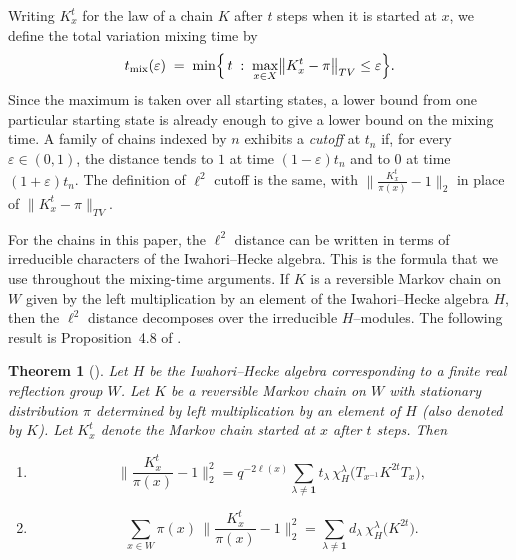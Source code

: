 \documentclass[11pt]{article}
\theoremstyle{plain}  %
\newtheorem{theorem}{Theorem}[section]
\begin{document}
Writing $K^{t}_{x}$ for the law of a chain $K$ after $t$ steps when it is
started at $x$, we define the total variation mixing time by
$$
  t_{\mathrm{mix}}(\varepsilon)
  \;=\; \min\Bigl\{\,t \;:\; \max_{x \in X}
        \bigl\|K^{t}_{x}-\pi\bigr\|_{TV} \le \varepsilon \Bigr\}.
$$
Since the maximum is taken over all starting states, a lower bound from one
particular starting state is already enough to give a lower bound on the mixing
time. A family of chains indexed by $n$ exhibits a \emph{cutoff} at $t_n$ if,
for every $\varepsilon\in(0,1)$, the distance tends to $1$ at time
$(1-\varepsilon)t_n$ and to $0$ at time $(1+\varepsilon)t_n$. The definition
of $\ell^{2}$ cutoff is the same, with
$\|\frac{K^{t}_{x}}{\pi(x)}-1\|_{2}$ in place of $\|K^{t}_{x}-\pi\|_{TV}$.



For the chains in this paper, the $\ell^{2}$ distance can be written in terms
of irreducible characters of the Iwahori--Hecke algebra. This is the formula
that we use throughout the mixing-time arguments. If $K$ is a reversible
Markov chain on $W$ given by the left multiplication by an element of the
Iwahori--Hecke algebra $H$, then the $\ell^{2}$ distance decomposes over the
irreducible $H$--modules. The following result is Proposition~4.8 of
\cite{DiaconisRam2000}.

\begin{theorem}[{\cite[Proposition~4.8]{DiaconisRam2000}}]
\label{thm:DRexpansion}
Let $H$ be the Iwahori--Hecke algebra corresponding to a finite real
reflection group $W$.  Let $K$ be a reversible Markov chain on $W$ with
stationary distribution $\pi$ determined
by left multiplication by an element of $H$ (also denoted by $K$).
Let $K_x^{t}$ denote the Markov chain started at $x$ after $t$ steps.
Then

\begin{enumerate}
\item
\begin{equation}\label{eq:l2norm}
\big\| \frac{K_x^{t}}{\pi(x)} -1\big\|_{2}^2
=q^{-2\ell(x)}
\sum_{\lambda\ne \mathbf{1}}
t_\lambda\,
\chi^\lambda_{H}\!\big(T_{x^{-1}}K^{2t}T_x\big),
\end{equation}

\item
\begin{equation}
\sum_{x\in W}\pi(x)\,
\big\| \frac{K_x^{t}}{\pi(x)} -1\big\|_{2}^2
=
\sum_{\lambda\ne \mathbf{1}}
d_\lambda\,
\chi^\lambda_{H}\!\big(K^{2t}\big).
\end{equation}
\end{enumerate}

\end{theorem}
\end{document}
